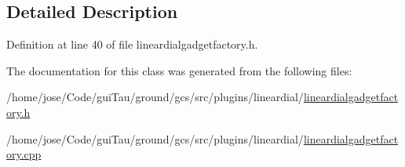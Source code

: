 \subsection{Detailed Description}


Definition at line 40 of file lineardialgadgetfactory.\-h.



The documentation for this class was generated from the following files\-:\begin{DoxyCompactItemize}
\item 
/home/jose/\-Code/gui\-Tau/ground/gcs/src/plugins/lineardial/\hyperlink{lineardialgadgetfactory_8h}{lineardialgadgetfactory.\-h}\item 
/home/jose/\-Code/gui\-Tau/ground/gcs/src/plugins/lineardial/\hyperlink{lineardialgadgetfactory_8cpp}{lineardialgadgetfactory.\-cpp}\end{DoxyCompactItemize}
